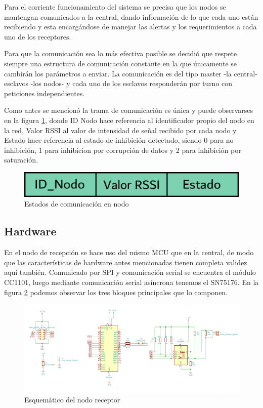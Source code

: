 Para el corriente funcionamiento del sistema se precisa que los nodos se mantengan comunicados a la central, dando información  
de lo que cada uno están recibiendo y esta encargándose de manejar las alertas y los requerimientos a cada uno de los 
receptores. \par 
Para que la comunicación sea lo más efectiva posible se decidió que respete siempre una estructura de comunicación constante
en la que únicamente se cambirán los parámetros a enviar. La comunicación es del tipo master -la central- esclavos -los nodos-
y cada uno de los esclavos responderán por turno con peticiones independientes. \par
Como antes se mencionó la trama de comunicación es única y puede observarses en la figura \ref{comunicacion_nodo}, donde 
ID Nodo hace referencia al identificador propio del nodo en la red, Valor RSSI al valor de intensidad de señal recibido por cada
nodo y Estado hace referencia al estado de inhibición detectado, siendo 0 para no inhibición, 1 para inhibicion por corrupción
de datos y 2 para inhibición por saturación.

\begin{figure}
	\centering
	\includegraphics[scale=0.43]{images/nodos/comunicacion_nodo.png}
    \caption{Estados de comunicación en nodo}
	\label{comunicacion_nodo}
\end{figure}


\subsection{Hardware}

En el nodo de recepción se hace uso del mismo MCU que en la central, de modo que las características de hardware antes mencionadas
tienen completa validez aquí también. Comunicado por SPI y comunicación serial se encuentra el módulo CC1101, luego mediante
comunicación serial asíncrona tenemos el SN75176. En la figura \ref{schema_nodo} podemos observar los tres bloques principales
que lo componen. \par 


\begin{figure}
	\centering
	\includegraphics[scale=0.3]{images/nodos/schema_nodo.png}
    \caption{Esquemático del nodo receptor}
	\label{schema_nodo}
\end{figure}

